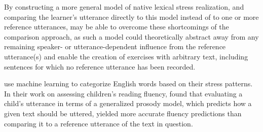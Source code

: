 	
	
		
	
	By constructing a more general model of native lexical stress realization, and comparing the learner's utterance directly to this model instead of to one or more reference utterances, 
	 may be able to overcome these shortcomings of the comparison approach, 
	as such a model could theoretically
	abstract away from any remaining speaker- or utterance-dependent influence from the reference utterance(s)
	and
	enable the creation of exercises with arbitrary text, including sentences for which no reference utterance has been recorded. 
	
	\textcite{Shahin2012a,Kim2011} use machine learning to categorize English words based on their stress patterns.
	 In their work on assessing children's reading fluency, \textcite{Duong2011} found that evaluating a child's utterance in terms of a generalized prosody model, which predicts how a given text should be uttered, yielded more accurate fluency predictions than comparing it to a reference utterance of the text in question. 
	 
